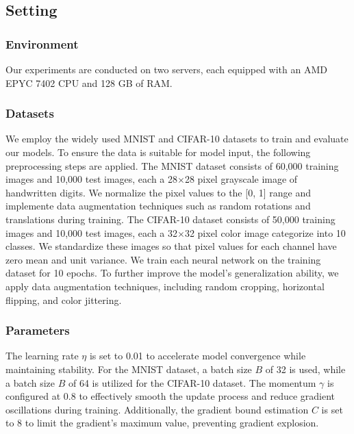 \documentclass[conference]{IEEEtran}
\begin{document}
\subsection{Setting}
\subsubsection{Environment} Our experiments are conducted on two servers, each equipped with an AMD EPYC 7402 CPU and 128 GB of RAM.
\subsubsection{Datasets} 
We employ the widely used MNIST\cite{xiao2017fashion} and CIFAR-10 datasets\cite{krizhevsky2009learning} to train and evaluate our models. To ensure the data is suitable for model input, the following preprocessing steps are applied. The MNIST dataset consists of 60,000 training images and 10,000 test images, each a 28$\times$28 pixel grayscale image of handwritten digits. We normalize the pixel values to the [0, 1] range and implemente data augmentation techniques such as random rotations and translations during training. The CIFAR-10 dataset consists of 50,000 training images and 10,000 test images, each a 32$\times$32 pixel color image categorize into 10 classes. We standardize these images so that pixel values for each channel have zero mean and unit variance. We train each neural network on the training dataset for 10 epochs. To further improve the model's generalization ability, we apply data augmentation techniques, including random cropping, horizontal flipping, and color jittering.




\subsubsection{Parameters} 
The learning rate $\eta$ is set to 0.01 to accelerate model convergence while maintaining stability. For the MNIST dataset, a batch size $B$ of 32 is used, while a batch size $B$ of 64 is utilized for the CIFAR-10 dataset. The momentum $\gamma$ is configured at 0.8 to effectively smooth the update process and reduce gradient oscillations during training. Additionally, the gradient bound estimation $C$ is set to 8 to limit the gradient's maximum value, preventing gradient explosion.
\end{document}
